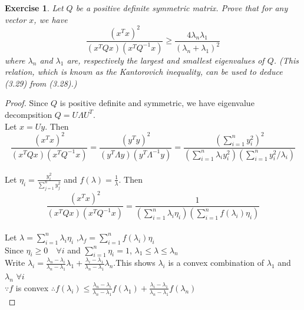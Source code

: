 \documentclass[11pt,a4paper]{article}
\renewcommand{\(}{\left(}
\renewcommand{\)}{\right)}
\newtheorem{exercise}{Exercise}
\begin{document}
  \begin{exercise}
  	Let $Q$ be a positive definite symmetric matrix. Prove that for any vector $x$, we have
  	\[\frac{(x^Tx)^2}{(x^TQx)(x^TQ^{-1}x)}\geq\frac{4\lambda_n\lambda_1}{(\lambda_n+\lambda_1)^2}\]
  	where $\lambda_n$ and $\lambda_1$ are, respectively the largest and smallest eigenvalues of $Q$. (This relation, which is known as the Kantorovich inequality, can be used to deduce (3.29) from (3.28).)
  \end{exercise}  
  \begin{proof}
  	Since $Q$ is positive definite and symmetric, we have eigenvalue decompsition $Q=U\Lambda U^T$.\\ 
  	Let $x=Uy$. Then $$\displaystyle \frac{(x^Tx)^2}{(x^TQx)(x^TQ^{-1}x)}=\frac{(y^Ty)^2}{(y^T\Lambda y)(y^T \Lambda^{-1}y)}=\frac{(\sum_{i=1}^n y_i^2)^2}{(\sum_{i=1}^n \lambda_i y_i^2)(\sum_{i=1}^n y_i^2/\lambda_i)}$$\\
  	Let $\displaystyle \eta_i=\frac{y_i^2}{\sum_{j=1}^n y_j^2}$ and $f(\lambda)=\frac{1}{\lambda}$. Then $$\displaystyle \frac{(x^Tx)^2}{(x^TQx)(x^TQ^{-1}x)}=\frac{1}{(\sum_{i=1}^n \lambda_i \eta_i)(\sum_{i=1}^n f(\lambda_i)\eta_i)}$$\\
  	Let $\displaystyle \lambda=\sum_{i=1}^n \lambda_i \eta_i$ ,\quad $\displaystyle \lambda_f=\sum_{i=1}^n f(\lambda_i) \eta_i$\\
  	Since $\eta_i \geq 0 \quad \forall i$ and $\sum_{i=1}^n \eta_i = 1$, $\lambda_1 \leq \lambda \leq \lambda_n$ \\
  	Write $\displaystyle \lambda_i=\frac{\lambda_n-\lambda_i}{\lambda_n-\lambda_1}\lambda_1+\frac{\lambda_i-\lambda_1}{\lambda_n-\lambda_1}\lambda_n$.\quad This shows $\lambda_i$ is a convex combination of $\lambda_1$ and $\lambda_n$ \quad $\forall i$\\
  	$\because f$ is convex \quad $\displaystyle \therefore f(\lambda_i) \leq \frac{\lambda_n-\lambda_i}{\lambda_n-\lambda_1}f(\lambda_1)+\frac{\lambda_i-\lambda_1}{\lambda_n-\lambda_1}f(\lambda_n)$\\ 
  	

\end{proof}
\end{document}
